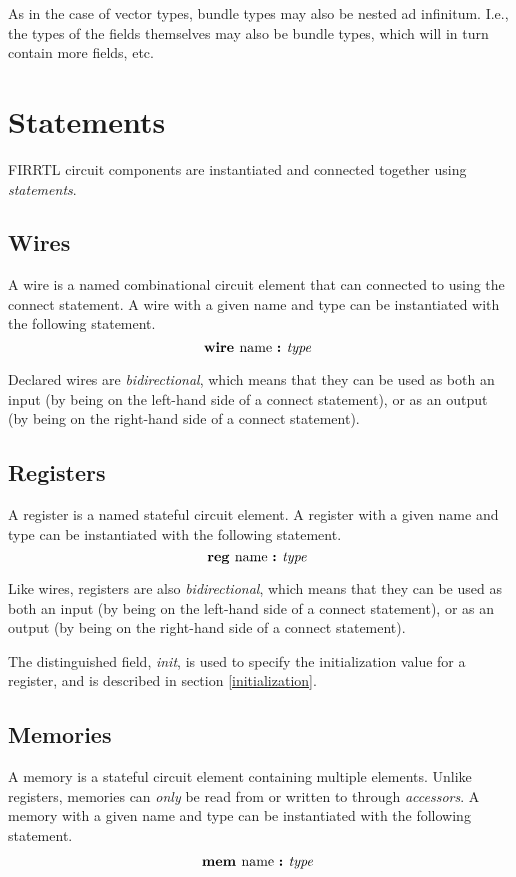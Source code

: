 \documentclass[12pt]{article}
\begin{document}
As in the case of vector types, bundle types may also be nested ad infinitum.
I.e., the types of the fields themselves may also be bundle types, which will in turn contain more fields, etc. 

\section{Statements}

FIRRTL circuit components are instantiated and connected together using {\em statements}.

\subsection{Wires}
A wire is a named combinational circuit element that can connected to using the connect statement.
A wire with a given name and type can be instantiated with the following statement.
\[
\text{\bf wire\ } \text{name } \text{\bf :\ } \text{\em type\ } \\
\]

Declared wires are {\em bidirectional}, which means that they can be used as both an input (by being on the left-hand side of a connect statement), or as an output (by being on the right-hand side of a connect statement).

\subsection{Registers}
A register is a named stateful circuit element.
A register with a given name and type can be instantiated with the following statement.
\[
\text{\bf reg\ } \text{name } \text{\bf :\ } \text{\em type\ } \\
\]

Like wires, registers are also {\em bidirectional}, which means that they can be used as both an input (by being on the left-hand side of a connect statement), or as an output (by being on the right-hand side of a connect statement). 

The distinguished field, {\em init}, is used to specify the initialization value for a register, and is described in section \ref{initialization}. 

\subsection{Memories}
A memory is a stateful circuit element containing multiple elements.
Unlike registers, memories can {\em only} be read from or written to through {\em accessors}.
A memory with a given name and type can be instantiated with the following statement.
\[
\begin{aligned}
\text{\bf mem\ } \text{name } \text{\bf :\ } \text{\em type\ } \\
\end{aligned}
\]
\end{document}
